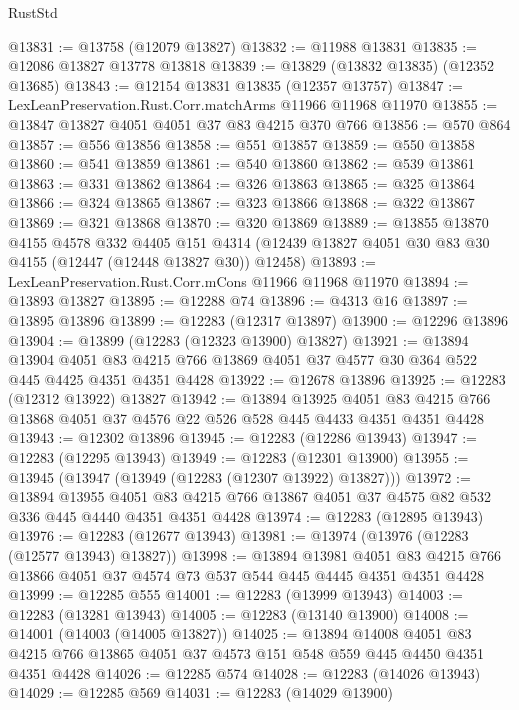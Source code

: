 \begin{lexlean}{RustStd}
\begin{coremodule}
@13831 := @13758 (@12079 @13827)
@13832 := @11988 @13831
@13835 := @12086 @13827 @13778 @13818
@13839 := @13829 (@13832 @13835) (@12352 @13685)
@13843 := @12154 @13831 @13835 (@12357 @13757)
@13847 := LexLeanPreservation.Rust.Corr.matchArms @11966 @11968 @11970
@13855 := @13847 @13827 @4051 @4051 @37 @83 @4215 @370 @766
@13856 := @570 @864
@13857 := @556 @13856
@13858 := @551 @13857
@13859 := @550 @13858
@13860 := @541 @13859
@13861 := @540 @13860
@13862 := @539 @13861
@13863 := @331 @13862
@13864 := @326 @13863
@13865 := @325 @13864
@13866 := @324 @13865
@13867 := @323 @13866
@13868 := @322 @13867
@13869 := @321 @13868
@13870 := @320 @13869
@13889 := @13855
    @13870
    @4155
    @4578
    @332
    @4405
    @151
    @4314
    (@12439 @13827 @4051 @30 @83 @30 @4155 (@12447 (@12448 @13827 @30)) @12458)
@13893 := LexLeanPreservation.Rust.Corr.mCons @11966 @11968 @11970
@13894 := @13893 @13827
@13895 := @12288 @74
@13896 := @4313 @16
@13897 := @13895 @13896
@13899 := @12283 (@12317 @13897)
@13900 := @12296 @13896
@13904 := @13899 (@12283 (@12323 @13900) @13827)
@13921 := @13894
    @13904
    @4051
    @83
    @4215
    @766
    @13869
    @4051
    @37
    @4577
    @30
    @364
    @522
    @445
    @4425
    @4351
    @4351
    @4428
@13922 := @12678 @13896
@13925 := @12283 (@12312 @13922) @13827
@13942 := @13894
    @13925
    @4051
    @83
    @4215
    @766
    @13868
    @4051
    @37
    @4576
    @22
    @526
    @528
    @445
    @4433
    @4351
    @4351
    @4428
@13943 := @12302 @13896
@13945 := @12283 (@12286 @13943)
@13947 := @12283 (@12295 @13943)
@13949 := @12283 (@12301 @13900)
@13955 := @13945 (@13947 (@13949 (@12283 (@12307 @13922) @13827)))
@13972 := @13894
    @13955
    @4051
    @83
    @4215
    @766
    @13867
    @4051
    @37
    @4575
    @82
    @532
    @336
    @445
    @4440
    @4351
    @4351
    @4428
@13974 := @12283 (@12895 @13943)
@13976 := @12283 (@12677 @13943)
@13981 := @13974 (@13976 (@12283 (@12577 @13943) @13827))
@13998 := @13894
    @13981
    @4051
    @83
    @4215
    @766
    @13866
    @4051
    @37
    @4574
    @73
    @537
    @544
    @445
    @4445
    @4351
    @4351
    @4428
@13999 := @12285 @555
@14001 := @12283 (@13999 @13943)
@14003 := @12283 (@13281 @13943)
@14005 := @12283 (@13140 @13900)
@14008 := @14001 (@14003 (@14005 @13827))
@14025 := @13894
    @14008
    @4051
    @83
    @4215
    @766
    @13865
    @4051
    @37
    @4573
    @151
    @548
    @559
    @445
    @4450
    @4351
    @4351
    @4428
@14026 := @12285 @574
@14028 := @12283 (@14026 @13943)
@14029 := @12285 @569
@14031 := @12283 (@14029 @13900)

\end{coremodule}
\end{lexlean}
